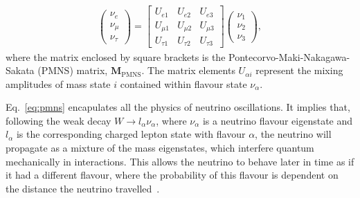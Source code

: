 \documentclass[aps,pra,12pt,notitlepage,tightenlines]{revtex4-1}
\newcommand\matr[1]{\bm{#1}}
\begin{document}
\begin{gather}
\label{eq:pmns}
 \begin{pmatrix}
 \nu_e \\
 \nu_\mu \\
 \nu_\tau 
 \end{pmatrix}
 =
 \begin{bmatrix}
 U_{e1} & U_{e2} & U_{e3} \\
 U_{\mu1} & U_{\mu2} & U_{\mu3} \\
 U_{\tau1} & U_{\tau2} & U_{\tau3}
 \end{bmatrix}
 \begin{pmatrix}
  \nu_1 \\
 \nu_2 \\
 \nu_3 
 \end{pmatrix}
 ,
\end{gather}
where the matrix enclosed by square brackets is the Pontecorvo-Maki-Nakagawa-Sakata (PMNS) matrix, $\matr{M}_\mathrm{PMNS}$. The matrix elements $U_{\alpha i}$ represent the mixing amplitudes of mass state $i$ contained within flavour state $\nu_\alpha$.

Eq.\ \eqref{eq:pmns} encapulates all the physics of neutrino oscillations. It implies that, following the weak decay $W \rightarrow l_\alpha\nu_\alpha$, where $\nu_\alpha$ is a neutrino flavour eigenstate and $l_\alpha$ is the corresponding charged lepton state with flavour $\alpha$, the neutrino will propagate as a mixture of the mass eigenstates, which interfere quantum mechanically in interactions. This allows the neutrino to behave later in time as if it had a different flavour, where the probability of this flavour is dependent on the distance the neutrino travelled~\cite{Kayser:2005cd}. 
\end{document}
